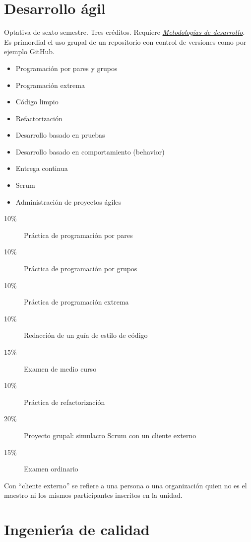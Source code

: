 \documentclass{article}
\begin{document}
\begin{multicols}{4}
\vfill\null \columnbreak

\hypertarget{da}{\section*{Desarrollo \'{a}gil}} 

Optativa de sexto semestre. Tres cr\'{e}ditos. Requiere
\hyperlink{mdd}{\em Metodolog\'{i}as de desarrollo}.  Es primordial el
uso grupal de un repositorio con control de versiones como por ejemplo
GitHub.

\begin{itemize}
\item{Programaci\'{o}n por pares y grupos}
\item{Programaci\'{o}n extrema}
\item{C\'{o}digo limpio}
\item{Refactorizaci\'{o}n}
\item{Desarrollo basado en pruebas}
\item{Desarrollo basado en comportamiento (behavior)}
\item{Entrega continua}
\item{Scrum}
\item{Administraci\'{o}n de proyectos \'{a}giles}
\end{itemize}

\begin{description}
\item[10\%]{Pr\'{a}ctica de programaci\'{o}n por pares}
\item[10\%]{Pr\'{a}ctica de programaci\'{o}n por grupos}
\item[10\%]{Pr\'{a}ctica de programaci\'{o}n extrema}  
\item[10\%]{Redacci\'{o}n de un gu\'{i}a de estilo de c\'{o}digo}
\item[15\%]{Examen de medio curso}  
\item[10\%]{Pr\'{a}ctica de refactorizaci\'{o}n}
\item[20\%]{Proyecto grupal: simulacro Scrum con un cliente externo}
\item[15\%]{Examen ordinario}
\end{description}  

Con ``cliente externo'' se refiere a una persona o una organizaci\'{o}n
quien no es el maestro ni los mismos participantes inscritos en la
unidad.

\vfill\null \columnbreak

\hypertarget{idc}{\section*{Ingenier\'{\i}a de calidad}} 


\end{multicols}
\end{document}
